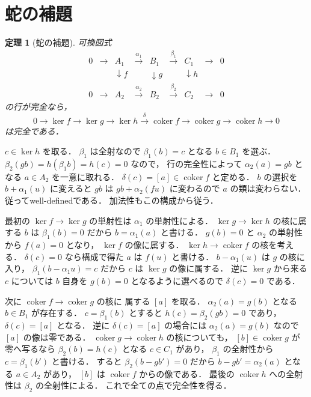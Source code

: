 \documentclass[a5paper,10pt,onecolumn]{jsarticle}
\makeatletter
\theoremstyle{mathnotetheorem}
\newtheorem{theorem}{定理}[section]
\renewcommand{\proofname}{証明}
\renewenvironment{proof}[1][\proofname]{%
  \par\pushQED{\qed}\normalfont\topsep4\p@\@plus2\p@\relax
  \trivlist\item[\hskip\labelsep\bfseries #1]\ignorespaces
}{\popQED\endtrivlist\@endpefalse}
\makeatother
\begin{document}
\section{蛇の補題}

\begin{theorem}[蛇の補題]\label{thm:snake}
可換図式
\[
 \begin{array}{ccccccccc}
 0&\to&A_1&\xrightarrow{\alpha_1}&B_1&
 \xrightarrow{\beta_1}&C_1&\to&0\\
 &&\downarrow f&&\downarrow g&&\downarrow h\\
 0&\to&A_2&\xrightarrow{\alpha_2}&B_2&
 \xrightarrow{\beta_2}&C_2&\to&0
 \end{array}
\]
の行が完全なら，
\[
 0\to\ker f\to\ker g\to\ker h
 \xrightarrow{\delta}\operatorname{coker}f\to
 \operatorname{coker}g\to\operatorname{coker}h\to0
\]
は完全である．
\end{theorem}
\begin{proof}
$c\in\ker h$ を取る．
$\beta_1$ は全射なので
$\beta_1(b)=c$ となる $b\in B_1$ を選ぶ．
$\beta_2(gb)=h(\beta_1b)=h(c)=0$ なので，
行の完全性によって
$\alpha_2(a)=gb$ となる $a\in A_2$ を一意に取れる．
$\delta(c)=[a]\in\operatorname{coker}f$ と定める．
$b$ の選択を $b+\alpha_1(u)$ に変えると
$gb$ は $gb+\alpha_2(fu)$ に変わるので
$a$ の類は変わらない．従ってwell-definedである．
加法性もこの構成から従う．

最初の $\ker f\to\ker g$ の単射性は
$\alpha_1$ の単射性による．
$\ker g\to\ker h$ の核に属する $b$ は
$\beta_1(b)=0$ だから
$b=\alpha_1(a)$ と書ける．
$g(b)=0$ と $\alpha_2$ の単射性から $f(a)=0$ となり，
$\ker f$ の像に属する．
$\ker h\to\operatorname{coker}f$ の核を考える．
$\delta(c)=0$ なら構成で得た $a$ は $f(u)$ と書ける．
$b-\alpha_1(u)$ は $g$ の核に入り，
$\beta_1(b-\alpha_1u)=c$ だから
$c$ は $\ker g$ の像に属する．
逆に $\ker g$ から来る $c$ については
$b$ 自身を $g(b)=0$ となるように選べるので
$\delta(c)=0$ である．

次に $\operatorname{coker}f\to\operatorname{coker}g$ の核に
属する $[a]$ を取る．
$\alpha_2(a)=g(b)$ となる $b\in B_1$ が存在する．
$c=\beta_1(b)$ とすると
$h(c)=\beta_2(gb)=0$ であり，
$\delta(c)=[a]$ となる．
逆に $\delta(c)=[a]$ の場合には
$\alpha_2(a)=g(b)$ なので
$[a]$ の像は零である．
$\operatorname{coker}g\to\operatorname{coker}h$ の核についても，
$[b]\in\operatorname{coker}g$ が零へ写るなら
$\beta_2(b)=h(c)$ となる $c\in C_1$ があり，
$\beta_1$ の全射性から $c=\beta_1(b')$ と書ける．
すると $\beta_2(b-gb')=0$ だから
$b-gb'=\alpha_2(a)$ となる $a\in A_2$ があり，
$[b]$ は $\operatorname{coker}f$ からの像である．
最後の $\operatorname{coker}h$ への全射性は
$\beta_2$ の全射性による．
これで全ての点で完全性を得る．
\end{proof}
\end{document}
